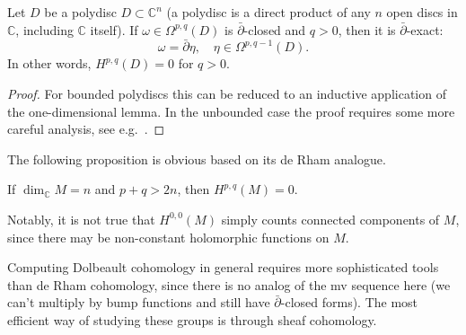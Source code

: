 \documentclass[english,letterpaper]{article}%
\numberwithin{equation}{section}
\numberwithin{figure}{section}
\numberwithin{table}{section}
\theoremstyle{definition}
\theoremstyle{definition}
\theoremstyle{definition}
\theoremstyle{plain}
\theoremstyle{plain}
\theoremstyle{plain}
\theoremstyle{plain}
\theoremstyle{remark}
\theoremstyle{remark}
\newcommand{\bbC}{\mathbb{C}}
\begin{document}
\begin{thm} Let $D$ be a polydisc $D\subset \bbC^n$ (a polydisc is a direct product of any $n$ open discs in $\bbC$, including $\bbC$ itself). If $\omega\in\Omega^{p,q}(D)$ is $\bar\partial$-closed and $q>0$, then it is $\bar\partial$-exact:
    \[\omega=\bar\partial\eta,\quad \eta\in\Omega^{p,q-1}(D).\]
    In other words, $H^{p,q}(D)=0$ for $q>0$.
\end{thm}
\begin{proof}
    For bounded polydiscs this can be reduced to an inductive application of the one-dimensional lemma. In the unbounded case the proof requires some more careful analysis, see e.g.\ \cite[Prop.\ 1.3.8 and Cor.\ 1.3.9]{Huybrechts}.
\end{proof}

The following proposition is obvious based on its de Rham analogue.

\begin{prop}
    If $\dim_\bbC M=n$ and $p+q>2n$, then $H^{p,q}(M)=0$.
\end{prop}

Notably, it is not true that $H^{0,0}(M)$ simply counts connected components of $M$, since there may be non-constant holomorphic functions on $M$.

Computing Dolbeault cohomology in general requires more sophisticated tools than de Rham cohomology, since there is no analog of the \gls{mv} sequence here (we can't multiply by bump functions and still have $\bar\partial$-closed forms). The most efficient way of studying these groups is through sheaf cohomology.
\end{document}
